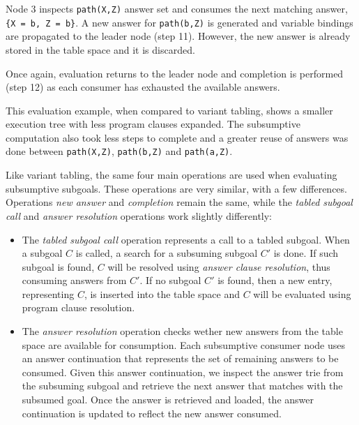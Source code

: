 Node 3 inspects \texttt{path(X,Z)} answer set and consumes the next matching answer, \texttt{\{X~=~b,~Z~=~b\}}.
A new answer for \texttt{path(b,Z)} is generated and variable bindings are propagated to the leader node (step 11).
However, the new answer is already stored in the table space and it is discarded.

Once again, evaluation returns to the leader node and completion is performed (step 12) as each consumer has exhausted the
available answers.

This evaluation example, when compared to variant tabling, shows a smaller execution tree with less
program clauses expanded. The subsumptive computation also took less steps to complete and a greater
reuse of answers was done between \texttt{path(X,Z)}, \texttt{path(b,Z)} and \texttt{path(a,Z)}.

Like variant tabling, the same four main operations are used when evaluating subsumptive subgoals.
These operations are very similar, with a few differences. Operations \textit{new answer} and
\textit{completion} remain the same, while the \textit{tabled subgoal call} and \textit{answer resolution}
operations work slightly differently:

\begin{itemize}
\item The \textit{tabled subgoal call} operation represents a call to a tabled subgoal.
When a subgoal $C$ is called, a search for a subsuming subgoal $C'$ is done. If such subgoal is found,
$C$ will be resolved using \textit{answer clause resolution}, thus consuming answers from $C'$.
If no subgoal $C'$ is found, then a new entry, representing $C$, is inserted into the table space and
$C$ will be evaluated using program clause resolution.

\item The \textit{answer resolution} operation checks wether new answers from the table space are
available for consumption. Each subsumptive consumer node uses an answer continuation that represents
the set of remaining answers to be consumed. Given this answer continuation, we inspect the answer trie
from the subsuming subgoal and retrieve the next answer that matches with the subsumed goal. Once the
answer is retrieved and loaded, the answer continuation is updated to reflect the new answer consumed.

\end{itemize}


